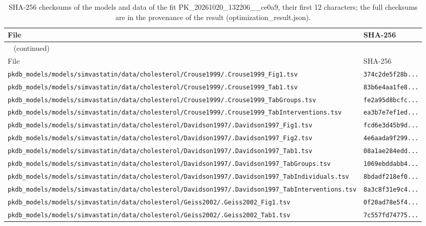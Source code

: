 \begin{longtable}{ll}
\caption{SHA-256 checksums of the models and data of the fit PK\_20261020\_132206\_\_ce0a9, their first 12 characters; the full checksums are in the provenance of the result (optimization\_result.json).}\label{tab:checksums:PK_20261020_132206__ce0a9} \\
\toprule
File & SHA-256 \\
\midrule
\endfirsthead
\multicolumn{2}{l}{\small\tablename~\thetable{} (continued)} \\
\toprule
File & SHA-256 \\
\midrule
\endhead
\bottomrule
\endlastfoot
\texttt{pkdb\_models/models/simvastatin/data/cholesterol/Crouse1999/.Crouse1999\_Fig1.tsv} & \texttt{374c2de5f28b...} \\
\texttt{pkdb\_models/models/simvastatin/data/cholesterol/Crouse1999/.Crouse1999\_Tab1.tsv} & \texttt{83b6e4aa1fe8...} \\
\texttt{pkdb\_models/models/simvastatin/data/cholesterol/Crouse1999/.Crouse1999\_TabGroups.tsv} & \texttt{fe2a95d8bcfc...} \\
\texttt{pkdb\_models/models/simvastatin/data/cholesterol/Crouse1999/.Crouse1999\_TabInterventions.tsv} & \texttt{ea3b7e7ef1ed...} \\
\texttt{pkdb\_models/models/simvastatin/data/cholesterol/Davidson1997/.Davidson1997\_Fig1.tsv} & \texttt{fcd6e3d45b9d...} \\
\texttt{pkdb\_models/models/simvastatin/data/cholesterol/Davidson1997/.Davidson1997\_Fig2.tsv} & \texttt{4e6aada9f299...} \\
\texttt{pkdb\_models/models/simvastatin/data/cholesterol/Davidson1997/.Davidson1997\_Tab1.tsv} & \texttt{08a1ae284edd...} \\
\texttt{pkdb\_models/models/simvastatin/data/cholesterol/Davidson1997/.Davidson1997\_TabGroups.tsv} & \texttt{1069ebddabb4...} \\
\texttt{pkdb\_models/models/simvastatin/data/cholesterol/Davidson1997/.Davidson1997\_TabIndividuals.tsv} & \texttt{8bdadf218ef0...} \\
\texttt{pkdb\_models/models/simvastatin/data/cholesterol/Davidson1997/.Davidson1997\_TabInterventions.tsv} & \texttt{8a3c8f31e9c4...} \\
\texttt{pkdb\_models/models/simvastatin/data/cholesterol/Geiss2002/.Geiss2002\_Fig1.tsv} & \texttt{0f20ad78e5f4...} \\
\texttt{pkdb\_models/models/simvastatin/data/cholesterol/Geiss2002/.Geiss2002\_Tab1.tsv} & \texttt{7c557fd74775...} \\

\end{longtable}
